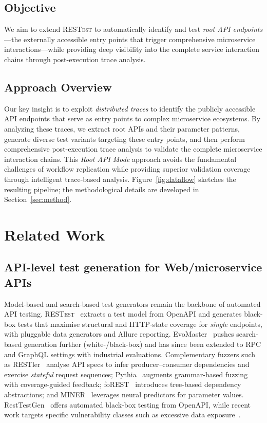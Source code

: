 \documentclass[conference]{IEEEtran}
\begin{document}
\subsection*{Objective}
We aim to extend \textsc{RESTest} to automatically identify and test \emph{root API endpoints}—the externally accessible entry points that trigger comprehensive microservice interactions—while providing deep visibility into the complete service interaction chains through post-execution trace analysis.

\subsection*{Approach Overview}
Our key insight is to exploit \emph{distributed traces} to identify the publicly accessible API endpoints that serve as entry points to complex microservice ecosystems. By analyzing these traces, we extract root APIs and their parameter patterns, generate diverse test variants targeting these entry points, and then perform comprehensive post-execution trace analysis to validate the complete microservice interaction chains. This \emph{Root API Mode} approach avoids the fundamental challenges of workflow replication while providing superior validation coverage through intelligent trace-based analysis. Figure~\ref{fig:dataflow} sketches the resulting pipeline; the methodological details are developed in Section~\ref{sec:method}.




\section{Related Work}
\label{sec:related}

\subsection{API-level test generation for Web/microservice APIs}
Model-based and search-based test generators remain the backbone of automated API testing. 
\textsc{RESTest}~\cite{martin2019restest} extracts a test model from OpenAPI and generates black-box tests that maximise structural and HTTP-state coverage for \emph{single} endpoints, with pluggable data generators and Allure reporting. 
EvoMaster~\cite{arcuri2019restful} pushes search-based generation further (white-/black-box) and has since been extended to RPC and GraphQL settings with industrial evaluations.
Complementary fuzzers such as RESTler~\cite{atlidakis2019restler} analyse API specs to infer producer--consumer dependencies and exercise \emph{stateful} request sequences; Pythia~\cite{atlidakis2020pythia} augments grammar-based fuzzing with coverage-guided feedback; foREST~\cite{lin2022forest} introduces tree-based dependency abstractions; and MINER~\cite{lyu2023miner} leverages neural predictors for parameter values. 
RestTestGen~\cite{viglianisi2020resttestgen} offers automated black-box testing from OpenAPI, while recent work targets specific vulnerability classes such as excessive data exposure~\cite{pan2023edefuzz}.
\end{document}
